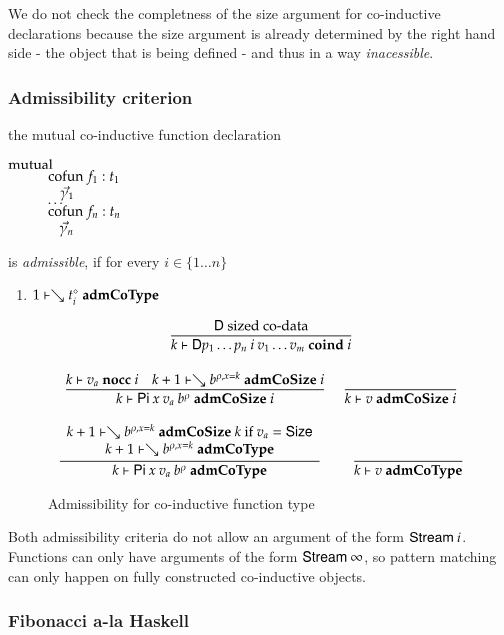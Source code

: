 We do not check the completness of the size argument for co-inductive declarations because the size argument is already determined by the right hand side - the object that is being defined - and thus in a way \emph{inacessible}. 

\subsubsection{Admissibility criterion}
the mutual co-inductive function declaration
\begin{bsp}
$\mathrm{mutual}\:$\\
$\spcx \cofun f_1 : t_1 $\\
$\spcx \spc \vec{\gamma}_1$\\
$\spcx \ldots$\\
$\spcx \cofun f_n : t_n $\\
$\spcx \spc \vec{\gamma}_n$
\end{bsp}
is \emph{admissible}, if  for every $i \in \{1 \ldots n \}  $
\begin{enumerate}
\item
$1\vdash\searrow t_i^{\diamond}\mbox{ \textbf{admCoType}}$
\end{enumerate}

\begin{figure}
\begin{gather*}
\ \dfrac{\mathsf{D} \mbox{ sized co-data}}{k\vdash\mathsf{D} p_1 \ldots p_n \: i \: v_1 \ldots v_m\mbox{ \textbf{coind} }i}
\\[2ex]
\ \dfrac{k\vdash v_a\mbox{ \textbf{nocc} }i
\quad
k+1\vdash\searrow b^{\rho,x=k}\mbox{ \textbf{admCoSize} }i}{k\vdash\mathsf{Pi} \: x \: v_a \: b^{\rho}\mbox{ \textbf{admCoSize} }i}
\quad
\ \dfrac{}{k\vdash v\mbox{ \textbf{admCoSize} }i}
\\[2ex]
\ \dfrac{\begin{array}[b]{c}k+1\vdash\searrow b^{\rho,x=k}\mbox{ \textbf{admCoSize} }k \mbox{ if } v_a = \mathsf{Size}\\k+1\vdash\searrow b^{\rho,x=k}\mbox{ \textbf{admCoType}}\end{array}}{k\vdash\mathsf{Pi} \: x \: v_a \: b^{\rho}\mbox{ \textbf{admCoType}}}
\qquad
\ \dfrac{}{k\vdash v\mbox{ \textbf{admCoType}}}
\end{gather*}
\caption{Admissibility for co-inductive function type}
\end{figure}

Both admissibility criteria do not allow an argument of the form $\mathsf{Stream}\: i$.
Functions can only have arguments of the form $\mathsf{Stream}\: \infty$, so pattern matching can only 
happen on fully constructed co-inductive objects.

\subsubsection{Fibonacci a-la Haskell}

